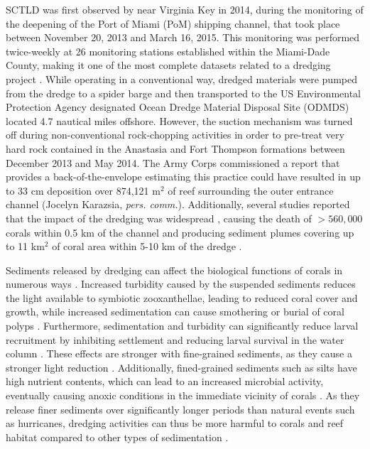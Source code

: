 \documentclass[preprint,12pt,authoryear]{elsarticle}
\begin{document}
SCTLD was first observed by \cite{precht2016unprecedented} near Virginia Key in 2014, during the monitoring of the deepening of the Port of Miami (PoM) shipping channel, that took place between November 20, 2013 and March 16, 2015. This monitoring was performed twice-weekly at 26 monitoring stations established within the Miami-Dade County, making it one of the most complete datasets related to a dredging project \citep{gintert2019regional}. While operating in a conventional way, dredged materials were pumped from the dredge to a spider barge and then transported to the US Environmental Protection Agency designated Ocean Dredge Material Disposal Site (ODMDS) located 4.7 nautical miles offshore. However, the suction mechanism was turned off during non-conventional rock-chopping activities in order to pre-treat very hard rock contained in the Anastasia and Fort Thompson formations between December 2013 and May 2014. The Army Corps commissioned a report that provides a back-of-the-envelope estimating this practice could have resulted in up to 33 cm deposition over 874,121 m$^2$ of reef surrounding the outer entrance channel (Jocelyn Karazsia, \textit{pers. comm.}). Additionally, several studies reported that the impact of the dredging was widespread \citep{miller2016detecting}, causing the death of  $> 560,000$ corals within 0.5 km of the channel \citep{cunning2019extensive} and producing sediment plumes covering up to 11 km$^2$ of coral area within 5-10 km of the dredge \citep{barnes2015sediment}.

Sediments released by dredging can affect the biological functions of corals in numerous ways \citep{erftemeijer2012environmental, jones2015effects}. Increased turbidity caused by the suspended sediments reduces the light available to symbiotic zooxanthellae, leading to reduced coral cover and growth, while increased sedimentation can cause smothering or burial of coral polyps \citep{erftemeijer2012environmental}. Furthermore, sedimentation and turbidity can significantly reduce larval recruitment by inhibiting settlement and reducing larval survival in the water column \citep{jones2015effects}. These effects are stronger with fine-grained sediments, as they cause a stronger light reduction \citep{fourney2017additive}. Additionally, fined-grained sediments such as silts have high nutrient contents, which can lead to an increased microbial activity, eventually causing anoxic conditions in the immediate vicinity of corals \citep{weber2012mechanisms}. As they release finer sediments over significantly longer periods than natural events such as hurricanes, dredging activities can thus be more harmful to corals and reef habitat compared to other types of sedimentation \citep{cunning2019extensive}.
\end{document}
